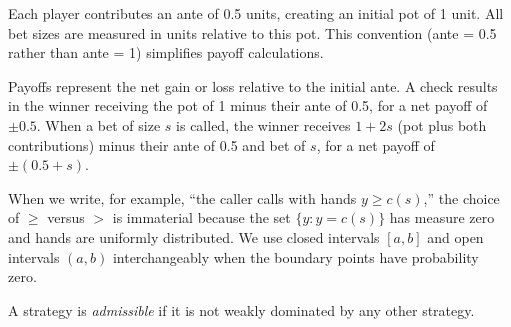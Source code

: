 \documentclass[../../main/main.tex]{subfiles}
\begin{document}
\begin{description}[style=nextline, leftmargin=1em, font=\bfseries]
    \item[Ante and Pot Size:] Each player contributes an ante of 0.5 units, creating an initial pot of 1 unit. All bet sizes are measured in units relative to this pot. This convention (ante = 0.5 rather than ante = 1) simplifies payoff calculations.
    
    \item[Payoffs:] Payoffs represent the net gain or loss relative to the initial ante. A check results in the winner receiving the pot of 1 minus their ante of 0.5, for a net payoff of $\pm 0.5$. When a bet of size $s$ is called, the winner receives $1 + 2s$ (pot plus both contributions) minus their ante of 0.5 and bet of $s$, for a net payoff of $\pm(0.5 + s)$.
    
    \item[Inequalities and Measure Zero:] When we write, for example, ``the caller calls with hands $y \geq c(s)$,'' the choice of $\geq$ versus $>$ is immaterial because the set $\{y : y = c(s)\}$ has measure zero and hands are uniformly distributed. We use closed intervals $[a,b]$ and open intervals $(a,b)$ interchangeably when the boundary points have probability zero.
    
    \item[Admissibility:] A strategy is \textit{admissible} if it is not weakly dominated by any other strategy.
\end{description}
\end{document}
